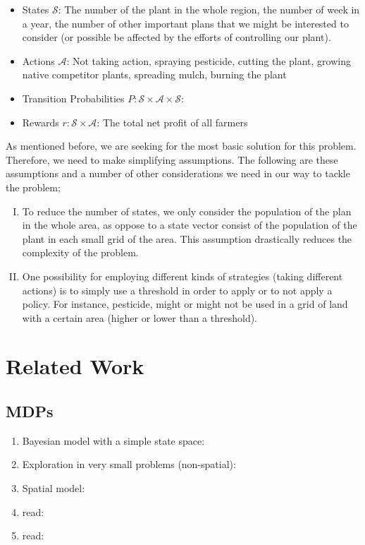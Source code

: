 \documentclass{article}
\theoremstyle{remark}
\theoremstyle{remark}
\theoremstyle{remark}
\theoremstyle{remark}
\theoremstyle{remark}
\theoremstyle{remark}
\newcommand{\marek}[1]{\textcolor{Bittersweet}{#1}}
\begin{document}
\begin{itemize}
 \item States $\mathcal{S}$: The number of the plant in the whole region, the number of week in a year, the number of other important plans that we might be interested to consider (or possible be affected by the efforts of controlling our plant).
 \item Actions $\mathcal{A}$: Not taking action, spraying pesticide, cutting the plant, growing native competitor plants, spreading mulch, burning the plant
 \item Transition Probabilities $P: \mathcal{S} \times \mathcal{A} \times \mathcal{S}$:
 \item Rewards $r: \mathcal{S} \times \mathcal{A}$: The total net profit of all farmers
\end{itemize}

As mentioned before, we are seeking for the most basic solution for this problem. Therefore, we need to make simplifying assumptions. The following are these assumptions and a number of other considerations we need in our way to tackle the problem;

\begin{enumerate}[(I)]
 \item To reduce the number of states, we only consider the population of the plan in the whole area, as oppose to a state vector consist of the population of the plant in each small grid of the area. This assumption drastically reduces the complexity of the problem.
 \item One possibility for employing different kinds of strategies (taking different actions) is to simply use a threshold in order to apply or to not apply a policy. For instance, pesticide, might or might not be used in a grid of land with a certain area (higher or lower than a threshold).
\end{enumerate}

\section{Related Work}

\subsection{MDPs}

\begin{enumerate}
	\item Bayesian model with a simple state space: \cite{Meisner2016}
	\item Exploration in very small problems (non-spatial): \cite{Hall2018,Taleghan2015}
	\item Spatial model: \cite{Nicol2017}
	\item \marek{read}: \cite{Albers2018}
	\item \marek{read}: \cite{Mehta2007}
\end{enumerate}
\end{document}
